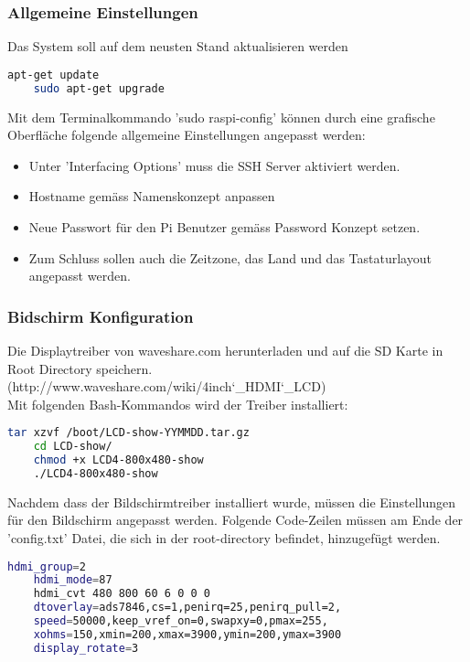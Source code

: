 \subsubsection{Allgemeine Einstellungen}
Das System soll auf dem neusten Stand aktualisieren werden
\begin{lstlisting}[backgroundcolor = \color{snippetcolor},
language = bash,
xleftmargin = 1cm,
framexleftmargin = 0.1em,
breaklines=true]
	apt-get update 
	sudo apt-get upgrade
\end{lstlisting}

Mit dem Terminalkommando ’sudo raspi-config’ können durch eine grafische Oberfläche folgende allgemeine Einstellungen angepasst werden:
\begin{itemize}
	\item Unter 'Interfacing Options' muss die SSH Server aktiviert werden.
	\item Hostname gemäss Namenskonzept anpassen
	\item Neue Passwort für den Pi Benutzer gemäss Password Konzept setzen.
	\item Zum Schluss sollen auch die Zeitzone, das Land und das Tastaturlayout angepasst werden.
\end{itemize}

\subsubsection{Bidschirm Konfiguration}
Die Displaytreiber von waveshare.com herunterladen und auf die SD Karte in Root Directory speichern. (http://www.waveshare.com/wiki/4inch\char`_HDMI\char`_LCD)\\
Mit folgenden Bash-Kommandos wird der Treiber installiert:
\begin{lstlisting}[backgroundcolor = \color{snippetcolor},
language = bash,
xleftmargin = 1cm,
framexleftmargin = 0.1em,
breaklines=true]
	tar xzvf /boot/LCD-show-YYMMDD.tar.gz 
	cd LCD-show/
	chmod +x LCD4-800x480-show
	./LCD4-800x480-show
\end{lstlisting}
Nachdem dass der Bildschirmtreiber installiert wurde, müssen die Einstellungen für den Bildschirm angepasst werden. Folgende Code-Zeilen müssen am Ende der ’config.txt’ Datei, die sich in der root-directory befindet, hinzugefügt werden.
\begin{lstlisting}[backgroundcolor = \color{snippetcolor},
language = bash,
xleftmargin = 1cm,
framexleftmargin = 0.1em,
breaklines=true]
	hdmi_group=2
	hdmi_mode=87
	hdmi_cvt 480 800 60 6 0 0 0
	dtoverlay=ads7846,cs=1,penirq=25,penirq_pull=2,
	speed=50000,keep_vref_on=0,swapxy=0,pmax=255,
	xohms=150,xmin=200,xmax=3900,ymin=200,ymax=3900
	display_rotate=3
\end{lstlisting}

